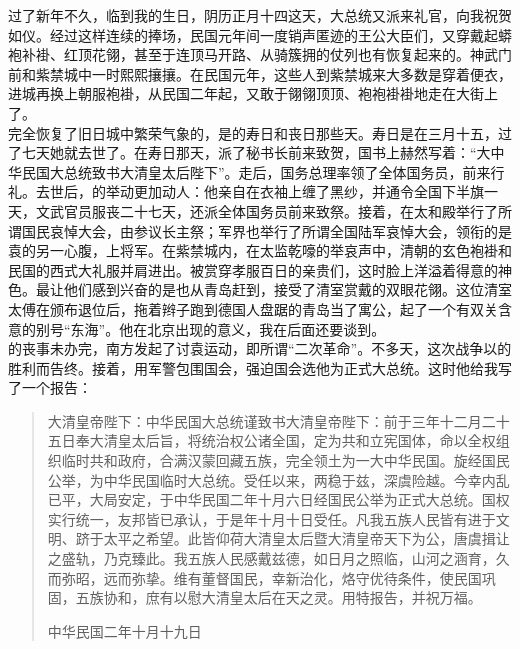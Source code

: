 过了新年不久，临到我的生日，阴历正月十四这天，大总统又派来礼官，向我祝贺如仪。经过这样连续的捧场，民国元年间一度销声匿迹的王公大臣们，又穿戴起蟒袍补褂、红顶花翎，甚至于连顶马开路、从骑簇拥的仗列也有恢复起来的。神武门前和紫禁城中一时熙熙攘攘。在民国元年，这些人到紫禁城来大多数是穿着便衣，进城再换上朝服袍褂，从民国二年起，又敢于翎翎顶顶、袍袍褂褂地走在大街上了。\\

完全恢复了旧日城中繁荣气象的，是的寿日和丧日那些天。寿日是在三月十五，过了七天她就去世了。在寿日那天，派了秘书长前来致贺，国书上赫然写着：“大中华民国大总统致书大清皇太后陛下”。走后，国务总理率领了全体国务员，前来行礼。去世后，的举动更加动人：他亲自在衣袖上缠了黑纱，并通令全国下半旗一天，文武官员服丧二十七天，还派全体国务员前来致祭。接着，在太和殿举行了所谓国民哀悼大会，由参议长主祭；军界也举行了所谓全国陆军哀悼大会，领衔的是袁的另一心腹，上将军。在紫禁城内，在太监乾嚎的举哀声中，清朝的玄色袍褂和民国的西式大礼服并肩进出。被赏穿孝服百日的亲贵们，这时脸上洋溢着得意的神色。最让他们感到兴奋的是也从青岛赶到，接受了清室赏戴的双眼花翎。这位清室太傅在颁布退位后，拖着辫子跑到德国人盘踞的青岛当了寓公，起了一个有双关含意的别号“东海”。他在北京出现的意义，我在后面还要谈到。\\

的丧事未办完，南方发起了讨袁运动，即所谓“二次革命”。不多天，这次战争以的胜利而告终。接着，用军警包围国会，强迫国会选他为正式大总统。这时他给我写了一个报告：\\

\begin{quote}
	大清皇帝陛下：中华民国大总统谨致书大清皇帝陛下：前于三年十二月二十五日奉大清皇太后旨，将统治权公诸全国，定为共和立宪国体，命以全权组织临时共和政府，合满汉蒙回藏五族，完全领土为一大中华民国。旋经国民公举，为中华民国临时大总统。受任以来，两稳于兹，深虞险越。今幸内乱已平，大局安定，于中华民国二年十月六日经国民公举为正式大总统。国权实行统一，友邦皆已承认，于是年十月十日受任。凡我五族人民皆有进于文明、跻于太平之希望。此皆仰荷大清皇太后暨大清皇帝天下为公，唐虞揖让之盛轨，乃克臻此。我五族人民感戴兹德，如日月之照临，山河之涵育，久而弥昭，远而弥挚。维有董督国民，幸新治化，烙守优待条件，使民国巩固，五族协和，庶有以慰大清皇太后在天之灵。用特报告，并祝万福。\\

\begin{flushright}
	中华民国二年十月十九日\\

\end{flushright}


\end{quote}

